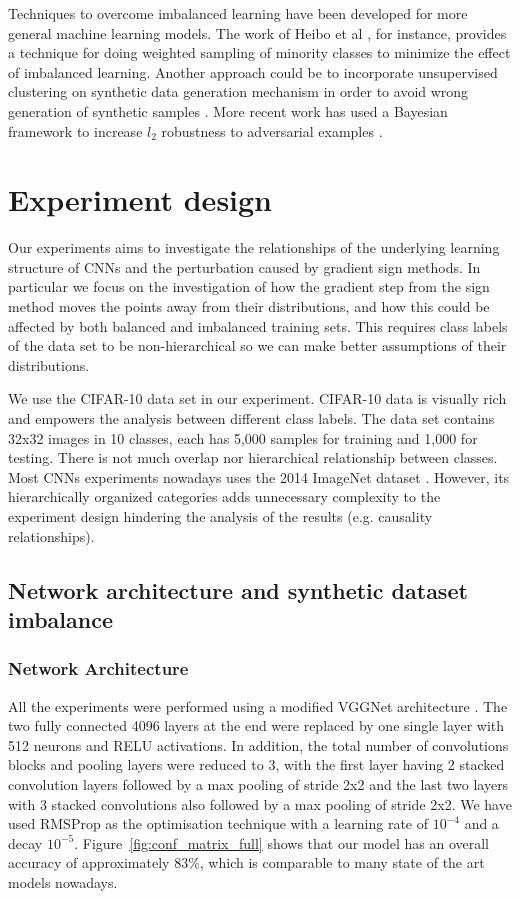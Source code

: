 \documentclass[runningheads,a4paper]{llncs}
\begin{document}
Techniques to overcome imbalanced learning have been developed for more general machine learning models. The work of Heibo et al \cite{he2008adasyn}, for instance, provides a technique for doing weighted sampling of minority classes to minimize the effect of imbalanced learning. Another approach could be to incorporate unsupervised clustering on synthetic data generation mechanism in order to avoid wrong generation of synthetic samples \cite{Barua2011}. More recent work has used a Bayesian framework to increase $l_2$ robustness to adversarial examples \cite{billovits}.

\section{Experiment design}

Our experiments aims to investigate the relationships of the underlying learning structure of CNNs and the perturbation caused by gradient sign methods. In particular we focus on the investigation of how the gradient step from the sign method moves the points away from their distributions, and how this could be affected by both balanced and imbalanced training sets. This requires  class labels of the data set to be non-hierarchical so we can make better assumptions of their distributions. 

We use the CIFAR-10 data set \cite{krizhevsky_2009} in our experiment. CIFAR-10 data is visually rich and empowers the analysis between different class labels. The data set contains 32x32 images in 10 classes, each has 5,000 samples for training and 1,000 for testing. There is not much overlap nor hierarchical relationship between classes. Most CNNs experiments nowadays uses the 2014 ImageNet dataset \cite{deng2009imagenet}. However, its hierarchically organized categories adds unnecessary complexity to the experiment design hindering the analysis of the results (e.g. causality relationships).
\subsection{Network architecture and synthetic dataset imbalance}

\subsubsection{Network Architecture} All the experiments were performed using a modified VGGNet architecture \cite{simonyan2014very}. The two fully connected 4096 layers at the end were replaced by one single layer with 512 neurons and RELU activations. In addition, the total number of convolutions blocks and pooling layers were reduced to 3, with the first layer having 2 stacked convolution layers followed by a max pooling of stride 2x2 and the last two layers with 3 stacked convolutions also followed by a max pooling of stride 2x2. We have used RMSProp  \cite{bengiormsprop} as the optimisation technique with a learning rate of $10^{-4}$ and a decay $10^{-5}$. Figure~\ref{fig:conf_matrix_full} shows that our model has an overall accuracy of approximately 83\%, which is comparable to many state of the art models nowadays.
\end{document}

